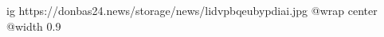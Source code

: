  
 
 
 
 

\ifcmt
  ig https://donbas24.news/storage/news/lidvpbqeubypdiai.jpg
  @wrap center
  @width 0.9
\fi
